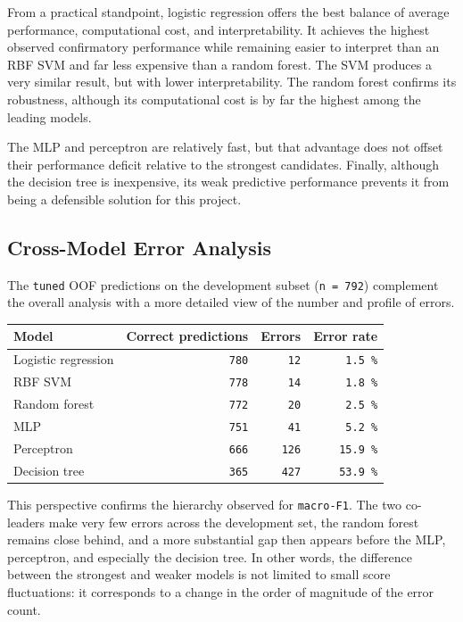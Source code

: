 From a practical standpoint, logistic regression offers the best balance of average performance, computational cost, and interpretability. It achieves the highest observed confirmatory performance while remaining easier to interpret than an RBF SVM and far less expensive than a random forest. The SVM produces a very similar result, but with lower interpretability. The random forest confirms its robustness, although its computational cost is by far the highest among the leading models.

The MLP and perceptron are relatively fast, but that advantage does not offset their performance deficit relative to the strongest candidates. Finally, although the decision tree is inexpensive, its weak predictive performance prevents it from being a defensible solution for this project.

\subsection{Cross-Model Error Analysis}
The \texttt{tuned} OOF predictions on the development subset (\texttt{n = 792}) complement the overall analysis with a more detailed view of the number and profile of errors.

\begin{table}[H]
\centering
\begin{tabular}{|l|r|r|r|}
\hline
\textbf{Model} & \textbf{Correct predictions} & \textbf{Errors} & \textbf{Error rate} \\
\hline
Logistic regression & \texttt{780} & \texttt{12} & \texttt{1.5 \%} \\
RBF SVM & \texttt{778} & \texttt{14} & \texttt{1.8 \%} \\
Random forest & \texttt{772} & \texttt{20} & \texttt{2.5 \%} \\
MLP & \texttt{751} & \texttt{41} & \texttt{5.2 \%} \\
Perceptron & \texttt{666} & \texttt{126} & \texttt{15.9 \%} \\
Decision tree & \texttt{365} & \texttt{427} & \texttt{53.9 \%} \\
\hline
\end{tabular}
\end{table}

This perspective confirms the hierarchy observed for \texttt{macro-F1}. The two co-leaders make very few errors across the development set, the random forest remains close behind, and a more substantial gap then appears before the MLP, perceptron, and especially the decision tree. In other words, the difference between the strongest and weaker models is not limited to small score fluctuations: it corresponds to a change in the order of magnitude of the error count.

